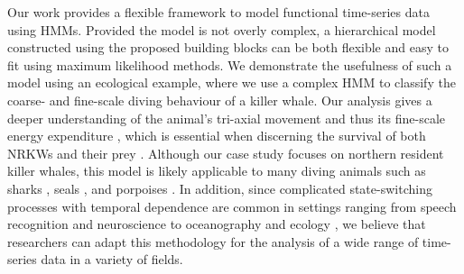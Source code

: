 
Our work provides a flexible framework to model functional time-series data using HMMs. Provided the model is not overly complex, a hierarchical model constructed using the proposed building blocks can be both flexible and easy to fit using maximum likelihood methods. We demonstrate the usefulness of such a model using an ecological example, where we use a complex HMM to classify the coarse- and fine-scale diving behaviour of a killer whale. Our analysis gives a deeper understanding of the animal's tri-axial movement and thus its fine-scale energy expenditure \citep{Gleiss:2011,Qasem:2012}, which is essential when discerning the survival of both NRKWs and their prey \citep{Noren:2011}. Although our case study focuses on northern resident killer whales, this model is likely applicable to many diving animals such as sharks \citep{Adam:2019}, seals \citep{Dot:2016}, and porpoises \citep{Barajas:2017}. In addition, since complicated state-switching processes with temporal dependence are common in settings ranging from speech recognition \citep{Juang:1991} and neuroscience \citep{Langrock:2013} to oceanography \citep{Bulla:2012} and ecology \citep{Adam:2019}, we believe that researchers can adapt this methodology for the analysis of a wide range of time-series data in a variety of fields.

\fi